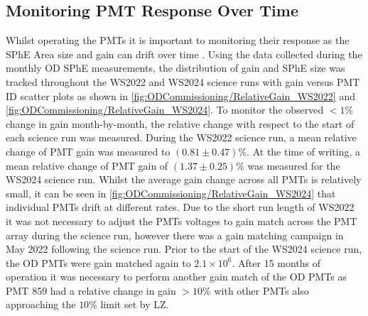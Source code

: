 \subsection{Monitoring PMT Response Over Time}
Whilst operating the PMTs it is important to monitoring their response as the SPhE Area size and gain can drift over time \cite{DayaBay:2016ggj,Super-Kamiokande:2023jbt}. Using the data collected during the monthly OD SPhE measurements, the distribution of gain and SPhE size was tracked throughout the WS2022 and WS2024 science runs with gain versus PMT ID scatter plots as shown in \autoref{fig:ODCommissioning/RelativeGain_WS2022} and \autoref{fig:ODCommissioning/RelativeGain_WS2024}.
To monitor the observed $<1\%$ change in gain month-by-month, the relative change with respect to the start of each science run was measured. During the WS2022 science run, a mean relative change of PMT gain was measured to $(0.81\pm0.47)\%$. At the time of writing, a mean relative change of PMT gain of $(1.37\pm0.25)\%$ was measured for the WS2024 science run. Whilst the average gain change across all PMTs is relatively small, it can be seen in \autoref{fig:ODCommissioning/RelativeGain_WS2024} that individual PMTs drift at different rates. Due to the short run length of WS2022 it was not necessary to adjust the PMTs voltages to gain match across the PMT array during the science run, however there was a gain matching campaign in May 2022 following the science run. Prior to the start of the WS2024 science run, the OD PMTs were gain matched again to $2.1\times10^{6}$. After 15 months of operation it was necessary to perform another gain match of the OD PMTs as PMT 859 had a relative change in gain $>10\%$ with other PMTs also approaching the $10\%$ limit set by LZ.

